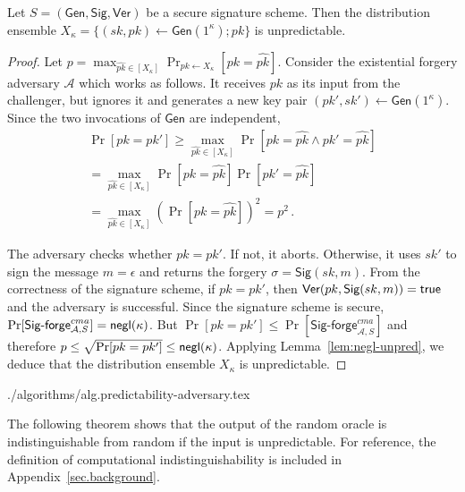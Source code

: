 \begin{lemma}\label{lem:pk-unpredictability}
  Let $S = (\textsf{Gen}, \textsf{Sig}, \textsf{Ver})$ be a secure signature scheme.
  Then the distribution ensemble
  $X_\kappa = \{(sk, pk) \gets \textsf{Gen}(1^\kappa); pk\}$ is
  unpredictable.
\end{lemma}
\begin{proof}
  Let
  $p = \max_{\widehat{pk} \in [X_\kappa]}\Pr_{pk \gets X_\kappa}[pk = \widehat{pk}]$.
  Consider the existential forgery adversary $\mathcal{A}$ which works as
  follows. It receives $pk$ as its input from the challenger, but ignores it
  and generates a new key pair $(pk', sk') \gets \textsf{Gen}(1^\kappa)$.
  Since the
  two invocations of $\textsf{Gen}$ are independent,
  \begin{align*}
    \Pr[pk = pk'] \geq \max_{\widehat{pk} \in [X_\kappa]}\Pr[pk = \widehat{pk} \land pk' = \widehat{pk}]\\
  = \max_{\widehat{pk} \in [X_\kappa]}\Pr[pk = \widehat{pk}]\Pr[pk' = \widehat{pk}]\\
  = \max_{\widehat{pk} \in [X_\kappa]}\left(\Pr[pk = \widehat{pk}]\right)^2
  = p^2
  \,.
  \end{align*}

  The adversary checks
  whether $pk = pk'$. If not, it aborts. Otherwise, it uses $sk'$ to sign the
  message $m = \epsilon$ and returns the forgery $\sigma = \textsf{Sig}(sk, m)$.
  From the correctness of the signature scheme, if $pk = pk'$, then
  $\textsf{Ver}(pk, \textsf{Sig}(sk, m)) = \mathsf{true}$ and the adversary is
  successful. Since the signature scheme is secure,
  $\Pr[\textsf{Sig-forge}^{cma}_{\mathcal{A},S}] = \textsf{negl}(\kappa)$.
  But $\Pr[pk = pk'] \leq \Pr[\textsf{Sig-forge}^{cma}_{\mathcal{A},S}]$ and
  therefore $p \leq \sqrt{\Pr[pk = pk']} \leq \textsf{negl}(\kappa)$. Applying
  Lemma~\ref{lem:negl-unpred}, we deduce that the distribution ensemble $X_\kappa$ is
  unpredictable.
\end{proof}

{./algorithms/alg.predictability-adversary.tex}

The following theorem shows that the output of the random oracle is
indistinguishable from random if the input is unpredictable. For reference, the
definition of computational indistinguishability is included in
Appendix~\ref{sec.background}.

